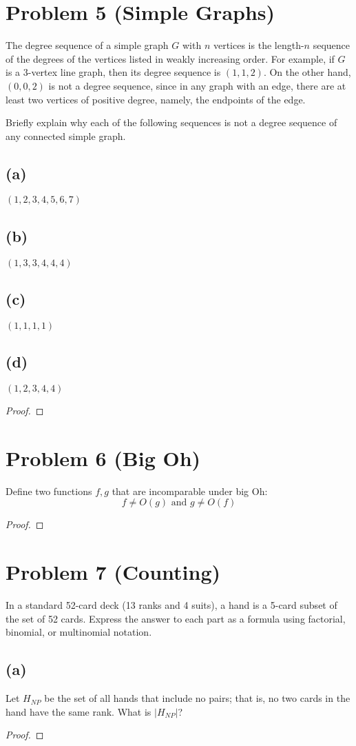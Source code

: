 \documentclass[14pt]{extarticle}
\begin{document}
\section{Problem 5 (Simple Graphs)}
The degree sequence of a simple graph $G$ with $n$ vertices is the length-$n$ sequence of the degrees of the vertices listed in weakly increasing order. For example, if $G$ is a 3-vertex line graph, then its degree sequence is $(1,1,2)$. On the other hand, $(0,0,2)$ is not a degree sequence, since in any graph with an edge, there are at
least two vertices of positive degree, namely, the endpoints of the edge.

Briefly explain why each of the following sequences is not a degree sequence of any connected simple graph.

\subsection{(a)}
$(1,2,3,4,5,6,7)$
\subsection{(b)}
$(1,3,3,4,4,4)$
\subsection{(c)}
$(1,1,1,1)$
\subsection{(d)}
$(1,2,3,4,4)$
\begin{proof}
\end{proof}

\section{Problem 6 (Big Oh)}
Define two functions $f,g$ that are incomparable under big Oh:
$$
f \neq O(g) \text{  and  } g \neq O(f)
$$
\begin{proof}
\end{proof}

\section{Problem 7 (Counting)}
In a standard 52-card deck (13 ranks and 4 suits), a hand is a 5-card subset of the set of 52 cards. Express the answer to each part as a formula using factorial, binomial, or multinomial notation.
\subsection{(a)}
Let $H_{NP}$ be the set of all hands that include no pairs; that is, no two cards in the hand have the same rank. What is $|H_{NP}|$?
\begin{proof}
\end{proof}
\end{document}
